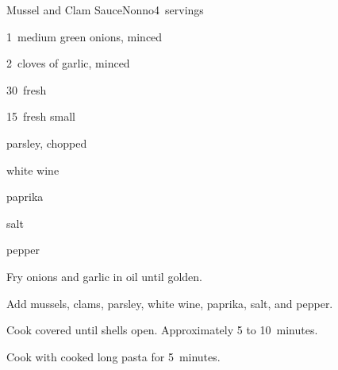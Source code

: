 \begin{recipe}{Mussel and Clam Sauce}{Nonno}{4~servings}

\begin{ingredients}
\item 1~medium green onions, minced
\item 2~cloves of garlic, minced
\item 30~fresh 
\item 15~fresh small 
\item \C{\half} parsley, chopped
\item {} white wine
\item paprika
\item salt
\item pepper
\end{ingredients}

\begin{directions}
\item Fry onions and garlic in oil until golden.
\item Add mussels, clams, parsley, white wine, paprika, salt, and pepper.
\item Cook covered until shells open. Approximately 5 to 10~minutes.
\item Cook with cooked long pasta for 5~minutes.
\end{directions}

\end{recipe}
